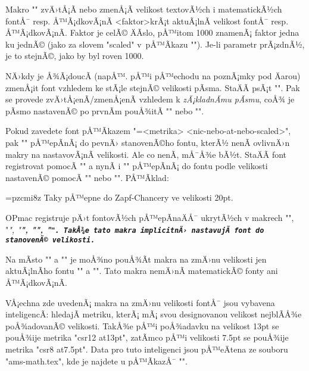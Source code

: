 Makro "" zvÄ›tÅ¡Ã­ nebo zmenÅ¡Ã­ velikost
textovÃ½ch i matematickÃ½ch fontÅ¯ resp. Å™Ã¡dkovÃ¡nÃ­ <faktor>krÃ¡t aktuÃ¡lnÃ­ 
velikost fontÅ¯ resp. Å™Ã¡dkovÃ¡nÃ­. 
Faktor je celÃ© ÄÃ­slo, pÅ™itom 1000 znamenÃ¡
faktor jedna ku jednÃ© (jako za slovem "scaled" v~pÅ™Ã­kazu "\font"). Je-li parametr
prÃ¡zdnÃ½, je to stejnÃ©, jako by byl roven 1000.

\begtt
\typoscale[800/800]    %
\typoscale[\magstep2/] %
\endtt

NÄ›kdy je Å¾Ã¡doucÃ­ (napÅ™. pÅ™i pÅ™echodu na poznÃ¡mky pod Äarou) zmenÅ¡it font vzhledem
ke stÃ¡le stejnÃ© velikosti pÃ­sma. StaÄÃ­ psÃ¡t
"\typobase{}". Pak se provede zvÄ›tÅ¡enÃ­/zmenÅ¡enÃ­
vzhledem k {\em zÃ¡kladnÃ­mu pÃ­smu}, coÅ¾ je pÃ­smo nastavenÃ© po prvnÃ­m pouÅ¾itÃ­ 
"\typosize" nebo "\typoscale".

Pokud zavedete font pÅ™Ã­kazem "\font\prepinac=<metrika> <nic-nebo-at-nebo-scaled>",
pak "\prepinac" pÅ™epÃ­nÃ¡ do pevnÄ› stanovenÃ©ho fontu, kterÃ½ nenÃ­ ovlivnÄ›n
makry na nastavovÃ¡nÃ­ velikosti. Ale co nenÃ­, mÅ¯Å¾e bÃ½t. StaÄÃ­ font
registrovat pomocÃ­ "\regfont\prepinac" a nynÃ­ i "\prepinac" pÅ™epÃ­nÃ¡ do fontu
podle velikosti nastavenÃ© pomocÃ­ "\typosize" nebo "\typoscale". PÅ™Ã­klad:
\par\nobreak

\begtt
\font\zapfchan=pzcmi8z  \regfont\zapfchan
\typosize[20/] Taky \zapfchan pÅ™epne do Zapf-Chancery ve velikosti 20pt.
\endtt

OPmac registruje pÄ›t fontovÃ½ch pÅ™epÃ­naÄÅ¯
ukrytÃ½ch v makrech "\rm", "\it", "\bf", "\bi", "\tt". TakÅ¾e tato makra
implicitnÄ› nastavujÃ­ font do stanovenÃ© velikosti.

Na mÃ­sto "\typosize" a "\typoscale" je moÅ¾no pouÅ¾Ã­t 
makra na zmÄ›nu velikosti jen aktuÃ¡lnÃ­ho fontu
"" a "\thefontscale[<faktor>]".
Tato makra nemÄ›nÃ­ matematickÃ© fonty ani Å™Ã¡dkovÃ¡nÃ­. 

VÅ¡echna zde uvedenÃ¡ makra na zmÄ›nu velikosti fontÅ¯ jsou vybavena
inteligencÃ­: hledajÃ­ metriku, kterÃ¡ mÃ¡ svou designovanou velikost nejblÃ­Å¾e
poÅ¾adovanÃ© velikosti. TakÅ¾e pÅ™i poÅ¾adavku na velikost 13pt se pouÅ¾ije metrika
"csr12 at13pt", zatÃ­mco pÅ™i velikosti 7.5pt se pouÅ¾ije metrika 
"csr8 at7.5pt". Data pro tuto inteligenci jsou pÅ™eÄtena ze souboru
"ams-math.tex", kde je najdete u pÅ™Ã­kazÅ¯ "\regtfm".

